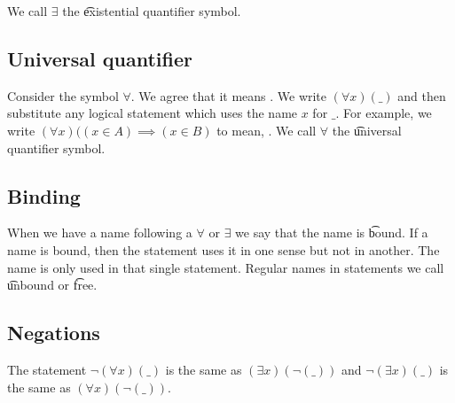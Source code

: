 We call $\exists $ the \t{existential quantifier} symbol.

\subsection*{Universal quantifier}

Consider the symbol $\forall$.
We agree that it means .
We write $(\forall x)(\_)$ and then substitute any logical statement which uses the name $x$ for $\_$.
For example, we write $(\forall x)((x \in A)\implies(x \in B)$ to mean, .
We call $\forall$ the \t{universal quantifier} symbol.

\subsection*{Binding}

When we have a name following a $\forall$ or $\exists $ we say that the name is \t{bound}.
If a name is bound, then the statement uses it in one sense but not in another.
The name is only used in that single statement.
Regular names in statements we call \t{unbound} or \t{free}.

\subsection*{Negations}

The statement $\neg(\forall x)(\_)$ is the same as $(\exists x)(\neg(\_))$ and $\neg(\exists x)(\_)$ is the same as $(\forall x)(\neg(\_))$.
